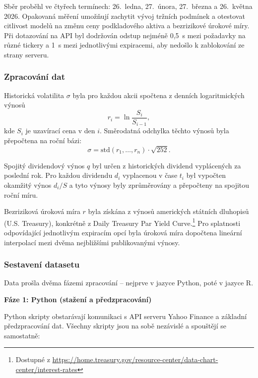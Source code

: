 Sběr proběhl ve čtyřech termínech: 26.~ledna, 27.~února, 27.~března a 26.~května 2026. Opakovaná měření umožňují zachytit vývoj tržních podmínek a otestovat citlivost modelů na změnu ceny podkladového aktiva a bezrizikové úrokové míry. Při dotazování na API byl dodržován odstup nejméně 0,5~s mezi požadavky na různé tickery a 1~s mezi jednotlivými expiracemi, aby nedošlo k zablokování ze strany serveru.

\subsubsection{Zpracování dat}

Historická volatilita \(\sigma\) byla pro každou akcii spočtena z denních logaritmických výnosů
\[
r_i = \ln\frac{S_i}{S_{i-1}},
\]
kde \(S_i\) je uzavírací cena v den \(i\). Směrodatná odchylka těchto výnosů byla přepočtena na roční bázi:
\[
\sigma = \text{std}(r_1,\dots,r_n) \cdot \sqrt{252}.
\]

Spojitý dividendový výnos \(q\) byl určen z historických dividend vyplácených za poslední rok. Pro každou dividendu \(d_i\) vyplacenou v čase \(t_i\) byl vypočten okamžitý výnos \(d_i / S\) a tyto výnosy byly zprůměrovány a přepočteny na spojitou roční míru.

Bezriziková úroková míra \(r\) byla získána z výnosů amerických státních dluhopisů (U.S. Treasury), konkrétně z Daily Treasury Par Yield Curve.\footnote{Dostupné z \url{https://home.treasury.gov/resource-center/data-chart-center/interest-rates}} Pro splatnosti odpovídající jednotlivým expiracím opcí byla úroková míra dopočtena lineární interpolací mezi dvěma nejbližšími publikovanými výnosy.

\subsubsection{Sestavení datasetu}

Data prošla dvěma fázemi zpracování – nejprve v jazyce Python, poté v jazyce R.

\bigskip
\noindent\textbf{Fáze 1: Python (stažení a předzpracování)}

Python skripty obstarávají komunikaci s API serveru Yahoo Finance a základní předzpracování dat. Všechny skripty jsou na sobě nezávislé a spouštějí se samostatně:

